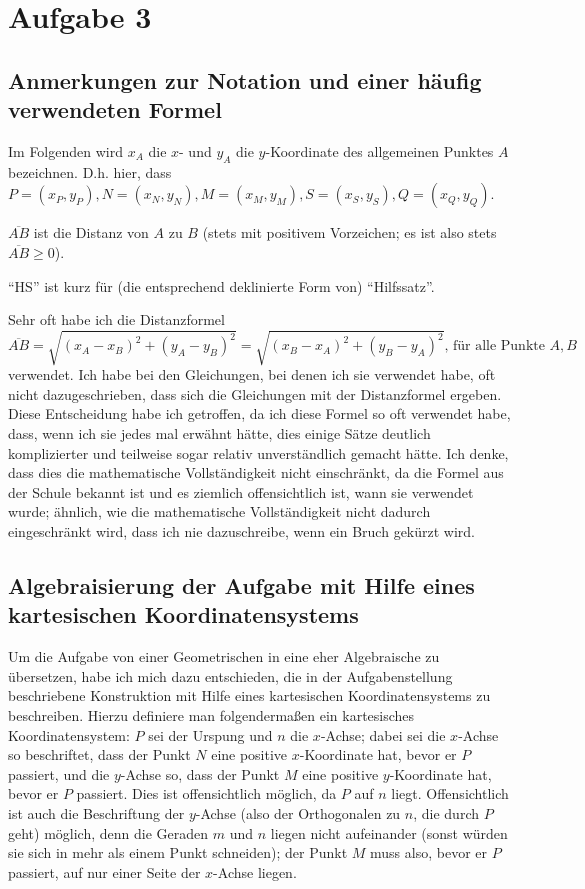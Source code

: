 \section{Aufgabe 3}

\subsection*{Anmerkungen zur Notation und einer häufig verwendeten Formel}

Im Folgenden wird $x_A$ die $x$- und $y_A$ die $y$-Koordinate des allgemeinen Punktes $A$ bezeichnen. D.h. hier, dass 
$P=(x_P, y_P), N=(x_N, y_N), M=(x_M, y_M), S=(x_S, y_S), Q=(x_Q, y_Q)$.

$\overline{AB}$ ist die Distanz von $A$ zu $B$ (stets mit positivem Vorzeichen; es ist also stets $\overline{AB}
\geq 0$).

"`HS"' ist kurz für (die entsprechend deklinierte Form von) "`Hilfssatz"'.

Sehr oft habe ich die Distanzformel 
\[
    \overline{AB}=\sqrt{(x_A-x_B)^2+(y_A-y_B)^2}=\sqrt{(x_B-x_A)^2+(y_B-y_A)^2}\text{, für alle Punkte $A,B$}
\] 
verwendet. Ich habe bei den Gleichungen, bei denen ich sie verwendet habe, oft nicht dazugeschrieben, dass sich die 
Gleichungen mit der Distanzformel ergeben. Diese Entscheidung habe ich getroffen, da ich diese Formel so oft verwendet 
habe, dass, wenn ich sie jedes mal erwähnt hätte, dies einige Sätze deutlich komplizierter und teilweise sogar 
relativ unverständlich gemacht hätte. Ich denke, dass dies die mathematische Vollständigkeit nicht einschränkt, da 
die Formel aus der Schule bekannt ist und es ziemlich offensichtlich ist, wann sie verwendet wurde; ähnlich, wie 
die mathematische Vollständigkeit nicht dadurch eingeschränkt wird, dass ich nie dazuschreibe, wenn ein Bruch 
gekürzt wird.

\subsection*{Algebraisierung der Aufgabe mit Hilfe eines kartesischen Koordinatensystems}

Um die Aufgabe von einer Geometrischen in eine eher Algebraische zu übersetzen, habe ich mich dazu entschieden, die 
in der Aufgabenstellung beschriebene Konstruktion mit Hilfe eines kartesischen Koordinatensystems zu beschreiben. 
Hierzu definiere man folgendermaßen ein kartesisches Koordinatensystem: $P$ sei der Urspung und $n$ die $x$-Achse; 
dabei sei die $x$-Achse so beschriftet, dass der Punkt $N$ eine positive $x$-Koordinate hat, bevor er $P$ passiert, 
und die $y$-Achse so, dass der Punkt $M$ eine positive $y$-Koordinate hat, bevor er $P$ passiert. Dies ist 
offensichtlich möglich, da $P$ auf $n$ liegt. Offensichtlich ist auch die Beschriftung der $y$-Achse (also der 
Orthogonalen zu $n$, die durch $P$ geht) möglich, denn die Geraden $m$ und $n$ liegen nicht aufeinander (sonst 
würden sie sich in mehr als einem Punkt schneiden); der Punkt $M$ muss also, bevor er $P$ passiert, auf nur einer 
Seite der $x$-Achse liegen.

